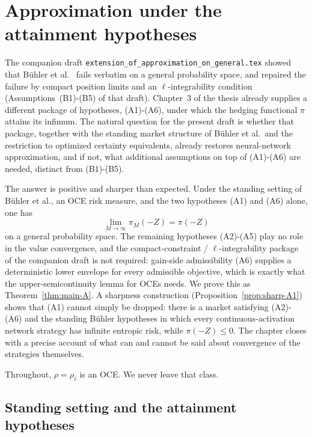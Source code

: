 \documentclass[11pt,a4paper]{report}
\numberwithin{equation}{chapter}
\theoremstyle{plain}
\theoremstyle{definition}
\begin{document}
\setcounter{chapter}{3}

\chapter{Approximation under the attainment hypotheses}

The companion draft \texttt{extension\_of\_approximation\_on\_general.tex} showed that B\"uhler et al.\ \cite[Proposition~4.3]{buehler} fails verbatim on a general probability space, and repaired the failure by compact position limits and an $\ell$-integrability condition (Assumptions~(B1)-(B5) of that draft). Chapter~3 of the thesis already supplies a different package of hypotheses, (A1)-(A6), under which the hedging functional $\pi$ attains its infimum. The natural question for the present draft is whether that package, together with the standing market structure of B\"uhler et al.\ and the restriction to optimized certainty equivalents, already restores neural-network approximation, and if not, what additional assumptions on top of (A1)-(A6) are needed, distinct from (B1)-(B5).

The answer is positive and sharper than expected. Under the standing setting of B\"uhler et al., an OCE risk measure, and the two hypotheses (A1) and (A6) alone, one has
\[
    \lim_{M\to\infty}\pi_M(-Z)=\pi(-Z)
\]
on a general probability space. The remaining hypotheses (A2)-(A5) play no role in the value convergence, and the compact-constraint / $\ell$-integrability package of the companion draft is not required: gain-side admissibility (A6) supplies a deterministic lower envelope for every admissible objective, which is exactly what the upper-semicontinuity lemma for OCEs needs. We prove this as Theorem~\ref{thm:main-A}. A sharpness construction (Proposition~\ref{prop:sharp-A1}) shows that (A1) cannot simply be dropped: there is a market satisfying (A2)-(A6) and the standing B\"uhler hypotheses in which every continuous-activation network strategy has infinite entropic risk, while $\pi(-Z)\le0$. The chapter closes with a precise account of what can and cannot be said about convergence of the strategies themselves.

Throughout, $\rho=\rho_\ell$ is an OCE. We never leave that class.

\section{Standing setting and the attainment hypotheses}\label{sec:setting-A}
\end{document}
